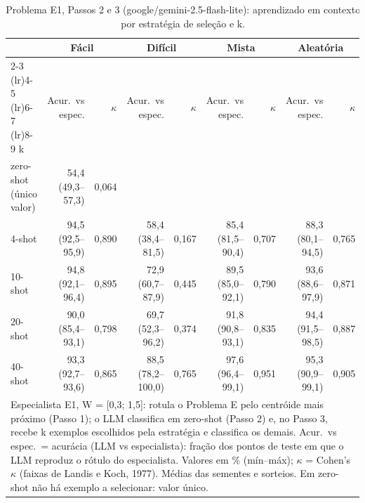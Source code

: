 \begin{table}[htbp]
\centering
\small
\caption{Problema E1, Passos 2 e 3 (google/gemini-2.5-flash-lite): aprendizado em contexto por estratégia de seleção e k.}
\label{tab:bloco2_E1_passo3_estrategia_x_k_flashlite}
\begin{tabular}{lrrrrrrrr}
\toprule
 & \multicolumn{2}{c}{Fácil} & \multicolumn{2}{c}{Difícil} & \multicolumn{2}{c}{Mista} & \multicolumn{2}{c}{Aleatória} \\ \cmidrule(lr){2-3} \cmidrule(lr){4-5} \cmidrule(lr){6-7} \cmidrule(lr){8-9}
k & Acur.\ vs espec. & $\kappa$ & Acur.\ vs espec. & $\kappa$ & Acur.\ vs espec. & $\kappa$ & Acur.\ vs espec. & $\kappa$ \\
\midrule
zero-shot (único valor) & 54,4 (49,3–57,3) & 0,064 &  &  &  &  &  &  \\
4-shot & 94,5 (92,5–95,9) & 0,890 & 58,4 (38,4–81,5) & 0,167 & 85,4 (81,5–90,4) & 0,707 & 88,3 (80,1–94,5) & 0,765 \\
10-shot & 94,8 (92,1–96,4) & 0,895 & 72,9 (60,7–87,9) & 0,445 & 89,5 (85,0–92,1) & 0,790 & 93,6 (88,6–97,9) & 0,871 \\
20-shot & 90,0 (85,4–93,1) & 0,798 & 69,7 (52,3–96,2) & 0,374 & 91,8 (90,8–93,1) & 0,835 & 94,4 (91,5–98,5) & 0,887 \\
40-shot & 93,3 (92,7–93,6) & 0,865 & 88,5 (78,2–100,0) & 0,765 & 97,6 (96,4–99,1) & 0,951 & 95,3 (90,9–99,1) & 0,905 \\
\bottomrule
\multicolumn{9}{p{0.95\linewidth}}{\footnotesize Especialista E1, W = [0,3; 1,5]: rotula o Problema E pelo centróide mais próximo (Passo 1); o LLM classifica em zero-shot (Passo 2) e, no Passo 3, recebe k exemplos escolhidos pela estratégia e classifica os demais. Acur.\ vs espec.\ = acurácia (LLM vs especialista): fração dos pontos de teste em que o LLM reproduz o rótulo do especialista. Valores em \% (mín–máx); $\kappa$ = Cohen's $\kappa$ (faixas de Landis e Koch, 1977). Médias das sementes e sorteios. Em zero-shot não há exemplo a selecionar: valor único.} \\
\end{tabular}
\end{table}
